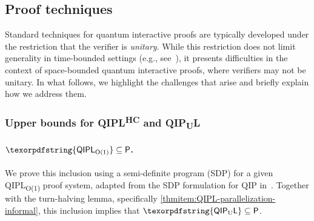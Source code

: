 \documentclass[11pt, a4paper]{article}
\numberwithin{equation}{section}
\numberwithin{figure}{section}
\newcommand{\Ptime}{\textnormal{\textsf{P}}\xspace}
\newcommand{\QIP}{\textnormal{\textsf{QIP}}\xspace}
\newcommand{\QIPLconst}{\texorpdfstring{\textnormal{\textsf{QIPL}\textsubscript{O(1)}}}\xspace}
\newcommand{\QIPUL}{\texorpdfstring{\textnormal{\textsf{QIP}\textsubscript{\textnormal{U}}\textsf{L}}}\xspace}
\newcommand{\QIPLHC}{\texorpdfstring{\textnormal{\textsf{QIPL}\textsuperscript{\textnormal{HC}}}}\xspace}
\begin{document}
\subsection{Proof techniques}

Standard techniques for quantum interactive proofs are typically developed under the restriction that the verifier is \textit{unitary}. While this restriction does not limit generality in time-bounded settings (e.g., see~\cite[Section 4.1.4]{VW16}), it presents difficulties in the context of space-bounded quantum interactive proofs, where verifiers may not be unitary. In what follows, we highlight the challenges that arise and briefly explain how we address them.  

\subsubsection{Upper bounds for \QIPLHC{} and \QIPUL{}}

\paragraph{$\QIPLconst \subseteq \Ptime$.} We prove this inclusion using a semi-definite program (SDP) for a given \QIPLconst{} proof system, adapted from the SDP formulation for \QIP{} in~\cite{VW16,Watrous16tutorial}. Together with the turn-halving lemma, specifically \ref{thmitem:QIPL-parallelization-informal}, this inclusion implies that $\QIPUL \subseteq \Ptime$. 
\end{document}
